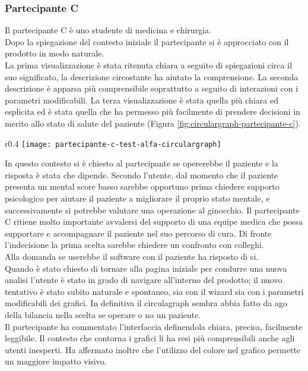 \subsubsection{Partecipante C}
Il partecipante C è uno studente di medicina e chirurgia. \\
Dopo la spiegazione del contesto iniziale il partecipante si è approcciato con il prodotto in modo naturale.\\
La prima visualizzazione è stata ritenuta chiara a seguito di spiegazioni circa il suo significato, la descrizione circostante ha aiutato la comprensione. La seconda descrizione è apparsa più comprensibile soprattutto a seguito di interazioni con i parametri modificabili. La terza visualizzazione è stata quella più chiara ed esplicita ed è stata quella che ha permesso più facilmente di prendere decisioni in merito allo stato di salute del paziente (Figura \ref{fig:circulargraph-partecipante-c}). 
\begin{wrapfigure}{r}{0.4\textwidth}
    \centering
    \texttt{[image: partecipante-c-test-alfa-circulargraph]}
    \caption{Circulargraph del test Alfa condotto dal partecipante C}
    \caption*{In questo test si è indagato l'ambito dell'operazione al ginocchio}
    \label{fig:circulargraph-partecipante-c}
\end{wrapfigure}
In questo contesto si è chiesto al partecipante se opererebbe il paziente e la risposta è stata che dipende. Secondo l'utente, dal momento che il paziente presenta un mental score basso sarebbe opportuno prima chiedere supporto psicologico per aiutare il paziente a migliorare il proprio stato mentale, e successivamente si potrebbe valutare una operazione al ginocchio. Il partecipante C ritiene molto importante avvalersi del supporto di una equipe medica che possa supportare e accompagnare il paziente nel suo percorso di cura. Di fronte l'indecisione la prima scelta sarebbe chiedere un confronto con colleghi. \\
Alla domanda se userebbe il software con il paziente ha risposto di si. \\
Quando è stato chiesto di tornare alla pagina iniziale per condurre una nuova analisi l'utente è stato in grado di navigare all'interno del prodotto; il nuovo tentativo è stato subito naturale e spontaneo, sia con il wizard sia con i parametri modificabili dei grafici. In definitiva il circulagraph sembra abbia fatto da ago della bilancia nella scelta se operare o no un paziente. \\
Il partecipante ha commentato l'interfaccia definendola chiara, precisa, facilmente leggibile. Il contesto che contorna i grafici li ha resi più comprensibili anche agli utenti inesperti. Ha affermato inoltre che l'utilizzo del colore nel grafico permette un maggiore impatto visivo. 